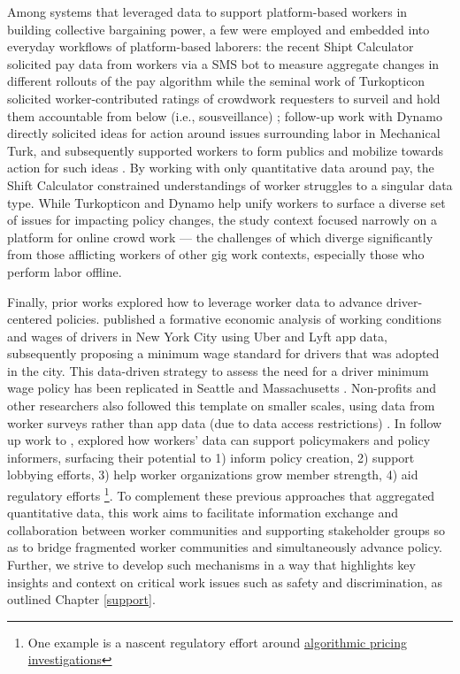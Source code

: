 {Among systems that leveraged data to support platform-based workers in building collective bargaining power, a few were employed and embedded into everyday workflows of platform-based laborers:}
the recent Shipt Calculator {solicited pay data from workers via a SMS bot to measure aggregate changes in different rollouts of the pay algorithm} \cite{6B4U} while {the seminal work of} Turkopticon {solicited worker-contributed ratings of crowdwork requesters to surveil and hold them accountable from below (i.e., sousveillance)} \cite{turkopticon}; follow-up work with Dynamo {directly solicited ideas for action around issues surrounding labor in Mechanical Turk, and subsequently supported workers to form publics and mobilize towards action for such ideas} \cite{dynamo}{. By working with only quantitative data around pay, the Shift Calculator constrained understandings of worker struggles to a singular data type. While Turkopticon and Dynamo help unify workers to surface a diverse set of issues for impacting policy changes, the study context focused narrowly on a platform for online crowd work --- the challenges of which diverge significantly from those afflicting workers of other gig work contexts, especially those who perform labor offline.} 

Finally, prior works explored how to leverage worker data to advance driver-centered policies. \citet{parrott2018earnings} published a formative economic analysis {of} working conditions and wages of drivers in New York City {using Uber and Lyft app data}, subsequently proposing a minimum wage standard {for drivers} that was adopted in the city. This data-driven strategy to assess the need for a driver minimum wage policy has been replicated in Seattle \cite{reich2020minimum} and Massachusetts \cite{jacobs2021massachusetts}. Non-profits and other researchers also followed this template on smaller scales, {using} data from worker surveys {rather than app data (due to data access restrictions)} \cite{leverage2022gig, McCullough_Dolber_Scoggins_Muna_Treuhaft_2022, McCullough_Dolber_2021, washington2019delivering}. 
In follow up work to \cite{zhang2023stakeholder}, \citet{policy_probes} explored how workers' data can support policymakers and policy informers, surfacing the{ir} potential to 1) inform policy creation, 2) support lobbying efforts, 3) help worker organizations grow member strength, 4) aid regulatory efforts \footnote{One example is a nascent regulatory effort around \href{https://www.ftc.gov/business-guidance/blog/2024/03/price-fixing-algorithm-still-price-fixing}{algorithmic pricing investigations}}.
To complement these previous approaches that aggregated quantitative data, this work aims to facilitate information exchange and collaboration between worker communities and supporting stakeholder groups so as to bridge fragmented worker communities and simultaneously advance policy. Further, we strive to develop such mechanisms in a way that highlights key insights and context on critical work issues such as safety and discrimination, as outlined Chapter \ref{support}.

